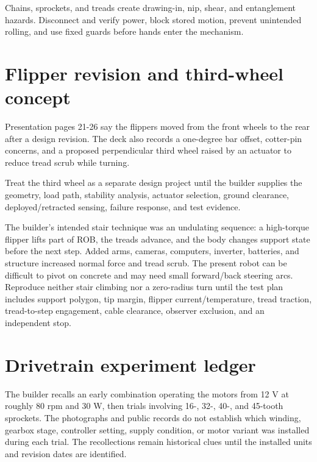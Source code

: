 \documentclass[10pt,openany]{book}
\begin{document}
\begin{safetybox}
Chains, sprockets, and treads create drawing-in, nip, shear, and entanglement hazards. Disconnect and verify power, block stored motion, prevent unintended rolling, and use fixed guards before hands enter the mechanism.
\end{safetybox}

\section{Flipper revision and third-wheel concept}

Presentation pages 21-26 say the flippers moved from the front wheels to the rear after a design revision. The deck also records a one-degree bar offset, cotter-pin concerns, and a proposed perpendicular third wheel raised by an actuator to reduce tread scrub while turning.


\Planned\quad Treat the third wheel as a separate design project until the builder supplies the geometry, load path, stability analysis, actuator selection, ground clearance, deployed/retracted sensing, failure response, and test evidence.

The builder's intended stair technique was an undulating sequence: a high-torque flipper lifts part of ROB, the treads advance, and the body changes support state before the next step. Added arms, cameras, computers, inverter, batteries, and structure increased normal force and tread scrub. The present robot can be difficult to pivot on concrete and may need small forward/back steering arcs. Reproduce neither stair climbing nor a zero-radius turn until the test plan includes support polygon, tip margin, flipper current/temperature, tread traction, tread-to-step engagement, cable clearance, observer exclusion, and an independent stop.

\section{Drivetrain experiment ledger}

The builder recalls an early combination operating the motors from 12 V at roughly 80 rpm and 30 W, then trials involving 16-, 32-, 40-, and 45-tooth sprockets. The photographs and public records do not establish which winding, gearbox stage, controller setting, supply condition, or motor variant was installed during each trial. The recollections remain historical clues until the installed units and revision dates are identified.
\end{document}

